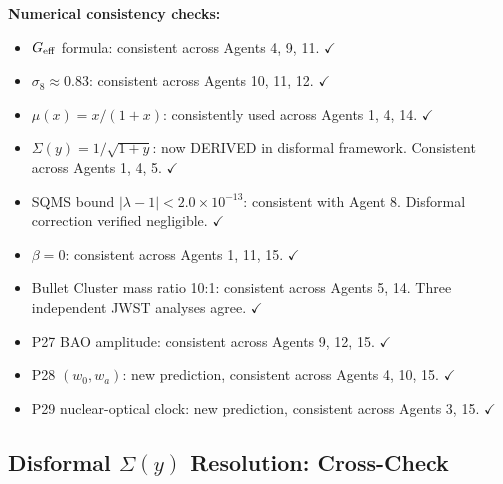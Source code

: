 \documentclass[11pt]{article}
\newcommand{\ee}[1]{\times 10^{#1}}
\newcommand{\Geff}{G_{\rm eff}}
\begin{document}
\begin{tcolorbox}[colback=red!5!white, colframe=red!70!black,
  title=\textbf{CROSS-CHECK RESULTS}]
\textbf{Numerical consistency checks:}
\begin{itemize}
  \item $\Geff$ formula: consistent across Agents 4, 9, 11. $\checkmark$
  \item $\sigma_8 \approx 0.83$: consistent across Agents 10, 11, 12. $\checkmark$
  \item $\mu(x) = x/(1+x)$: consistently used across Agents 1, 4, 14. $\checkmark$
  \item $\Sigma(y) = 1/\sqrt{1+y}$: now DERIVED in disformal framework.
    Consistent across Agents 1, 4, 5. $\checkmark$
  \item SQMS bound $|\lambda-1| < 2.0\ee{-13}$: consistent with Agent 8.
    Disformal correction verified negligible. $\checkmark$
  \item $\beta = 0$: consistent across Agents 1, 11, 15. $\checkmark$
  \item Bullet Cluster mass ratio 10:1: consistent across Agents 5, 14.
    Three independent JWST analyses agree. $\checkmark$
  \item P27 BAO amplitude: consistent across Agents 9, 12, 15. $\checkmark$
  \item P28 $(w_0, w_a)$: new prediction, consistent across Agents 4, 10, 15. $\checkmark$
  \item P29 nuclear-optical clock: new prediction, consistent across Agents 3, 15. $\checkmark$
\end{itemize}

\end{tcolorbox}

\subsection{Disformal $\Sigma(y)$ Resolution: Cross-Check}
\end{document}
